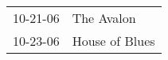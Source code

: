 \begin{supertabular}{p{0.07\textwidth}p{0.23\textwidth}}
 10-21-06 &      The Avalon \\
 10-23-06 &  House of Blues \\
\end{supertabular}
